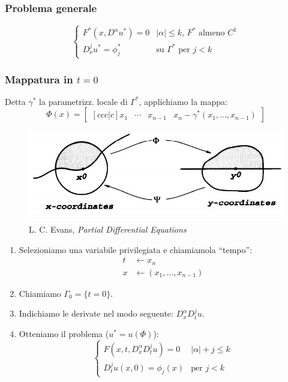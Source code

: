 \documentclass[serif,notheorems]{beamer}
\theoremstyle{definition} %
\theoremstyle{remark}
\begin{document}
\begin{frame}
\frametitle{Problema generale}
\begin{equation*}
\begin{cases}
F^*(x,D^\alpha u^*)=0 & |\alpha | \leq k, \, F^* \text{ almeno } C^1\\
D^j_\nu u^* = \phi_j^* & \text{su } \Gamma^* \text{ per }j<k 
\end{cases}
\end{equation*}
\end{frame}

\begin{frame}
\frametitle{Mappatura in $t=0$}
Detta $\gamma^*$ la parametrizz. locale di $\Gamma^*$, applichiamo la mappa:
$$\Phi (x) = 
\begin{bmatrix}[ccc|c]
x_1 & \cdots & x_{n-1} & x_n-\gamma^* (x_1,\ldots , x_{n-1})
\end{bmatrix}$$
\begin{figure}[H]
\centering
\includegraphics[scale=.35]{flatb}
\caption{\tiny{L. C. Evans, \textit{Partial Differential Equations}}}
\end{figure}
\end{frame}

\begin{frame}
\begin{enumerate}
\item Selezioniamo una variabile privilegiata e chiamiamola ``tempo'':
\begin{align*}
t & \leftarrow x_n \\
x & \leftarrow (x_1,\ldots , x_{n-1})
\end{align*}
\item Chiamiamo $\Gamma_0 = \{t=0\}$.
\item Indichiamo le derivate nel modo seguente: $D^\alpha_x D^j_t u$.
\item Otteniamo il problema ($u^*=u(\Phi)$):
\begin{equation*}
\begin{cases}
F(x,t, D^\alpha_x D^j_t u)=0 & |\alpha | +j \leq k\\
D^j_t u (x,0)= \phi_j(x) & \text{per }j<k 
\end{cases}
\end{equation*}
\end{enumerate}
\end{frame}
\end{document}
